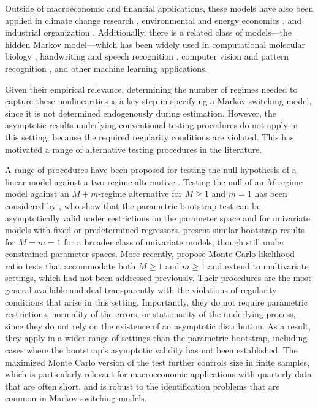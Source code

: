 Outside of macroeconomic and financial applications, these models have also been applied in climate change research \citep{golosov2014optimal, dietz2015endogenous}, environmental and energy economics \citep{cevik2021renewable, charfeddine2017impact}, and industrial organization \citep{aguirregabiria2007sequential, sweeting2013dynamic}. Additionally, there is a related class of models---the hidden Markov model---which has been widely used in computational molecular biology \citep{krogh1994hidden, baldi1994hidden}, handwriting and speech recognition \citep{rabiner1986introduction, nag1986script, RabJuanFundamentals, jelinek1997statistical}, computer vision and pattern recognition \citep{bunke2001hidden}, and other machine learning applications.

Given their empirical relevance, determining the number of regimes needed to capture these nonlinearities is a key step in specifying a Markov switching model, since it is not determined endogenously during estimation. However, the asymptotic results underlying conventional testing procedures do not apply in this setting, because the required regularity conditions are violated. This has motivated a range of alternative testing procedures in the literature.

A range of procedures have been proposed for testing the null hypothesis of a linear model against a two-regime alternative \citep{hansen92, hansen96, garcia98, chowhite07, marmer2008, chp14, kso2014modqlr, dufourluger17, quzhuo2021likelihood}. Testing the null of an \(M\)-regime model against an \(M+m\)-regime alternative for \(M \geq 1\) and \(m = 1\) has been considered by \citet{kasshi2018}, who show that the parametric bootstrap test can be asymptotically valid under restrictions on the parameter space and for univariate models with fixed or predetermined regressors. \citet{quzhuo2021likelihood} present similar bootstrap results for \(M = m = 1\) for a broader class of univariate models, though still under constrained parameter spaces. More recently, \citet{rodrondufour_mcmstest} propose Monte Carlo likelihood ratio tests that accommodate both \(M \geq 1\) and \(m \geq 1\) and extend to multivariate settings, which had not been addressed previously. Their procedures are the most general available and deal transparently with the violations of regularity conditions that arise in this setting. Importantly, they do not require parametric restrictions, normality of the errors, or stationarity of the underlying process, since they do not rely on the existence of an asymptotic distribution. As a result, they apply in a wider range of settings than the parametric bootstrap, including cases where the bootstrap's asymptotic validity has not been established. The maximized Monte Carlo version of the test further controls size in finite samples, which is particularly relevant for macroeconomic applications with quarterly data that are often short, and is robust to the identification problems that are common in Markov switching models.

